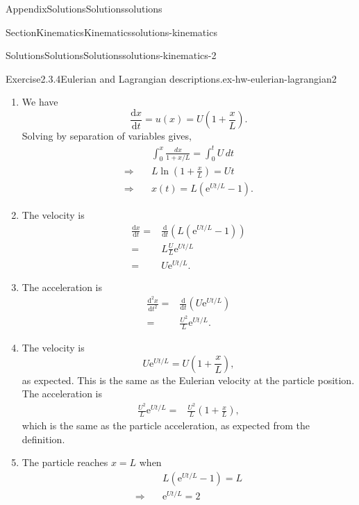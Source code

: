 \documentclass[oneside,10pt,]{book}
\numberwithin{equation}{section}
\newcommand{\e}{\mathrm{e}}
\newcommand{\de}{\mathrm{d}}
\newcommand{\dd}[2]{\frac{\de#1}{\de#2}}
\newcommand{\pd}[2]{\frac{\partial#1}{\partial#2}}
\newcommand{\be}{\boldsymbol{e}}
\begin{document}
\begin{appendixptx}{Appendix}{Solutions}{}{Solutions}{}{}{solutions}
\begin{sectionptx}{Section}{Kinematics}{}{Kinematics}{}{}{solutions-kinematics}
\begin{solutions-subsection-numberless}{Solutions}{Solutions}{}{Solutions}{}{}{solutions-kinematics-2}
\begin{divisionsolution}{Exercise}{2.3.4}{Eulerian and Lagrangian descriptions.}{ex-hw-eulerian-lagrangian2}
\begin{enumerate}[font=\bfseries,label=(\alph*),ref=\alph*]
\begin{align*}
=& u\pd{u}{x}\be_x\\
= & U\left(1+\frac{x}{L}\right)\frac{U}{L}\be_x\\
= & \frac{U^2}{L}\left(1+\frac{x}{L}\right)\be_x
\end{align*}
%
\item[(b)]\noindent\hypertarget{ex-hw-eulerian-lagrangian2-4-2-main}{}We have%
\begin{equation*}
\dd{x}{t}=u(x)=U\left(1+\frac{x}{L}\right).
\end{equation*}
Solving by separation of variables gives,%
\begin{align*}
&\int_0^x\frac{dx}{1+x/L}=\int_0^t U\,dt\\
\Rightarrow\quad& L\ln\left(1+\frac{x}{L}\right)=Ut\\
\Rightarrow\quad& x(t)=L\left(\e^{Ut/L}-1\right).
\end{align*}
%
\item[(c)]\noindent\hypertarget{ex-hw-eulerian-lagrangian2-5-2-main}{}The velocity is%
\begin{align*}
\dd{x}{t}=&\dd{}{t}\left(L\left(\e^{Ut/L}-1\right)\right)\\
=& L\frac{U}{L}\e^{Ut/L}\\
=& U\e^{Ut/L}.
\end{align*}
%
\item[(d)]\noindent\hypertarget{ex-hw-eulerian-lagrangian2-6-2-main}{}The acceleration is%
\begin{align*}
\dd{^2x}{t^2}=&\dd{}{t}\left(U\e^{Ut/L}\right)\\
=& \frac{U^2}{L}\e^{Ut/L}.
\end{align*}
%
\item[(e)]\noindent\hypertarget{ex-hw-eulerian-lagrangian2-7-2-main}{}The velocity is%
\begin{equation*}
U\e^{Ut/L}=U\left(1+\frac{x}{L}\right),
\end{equation*}
as expected. This is the same as the Eulerian velocity at the particle position. The acceleration is%
\begin{align*}
\frac{U^2}{L}\e^{Ut/L}=&\frac{U^2}{L}\left(1+\frac{x}{L}\right),
\end{align*}
which is the same as the particle acceleration, as expected from the definition.%
\item[(f)]\noindent\hypertarget{ex-hw-eulerian-lagrangian2-8-2-main}{}The particle reaches \(x=L\) when%
\begin{align*}
& L\left(\e^{Ut/L}-1\right)=L\\
\Rightarrow\quad& \e^{Ut/L}=2\\

\end{align*}
\end{enumerate}
\end{divisionsolution}
\end{solutions-subsection-numberless}
\end{sectionptx}
\end{appendixptx}
\end{document}
